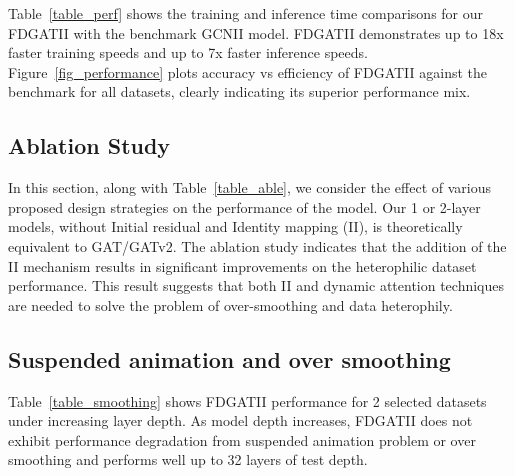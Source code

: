 \documentclass{article}
\begin{document}
Table~\ref{table_perf} shows the training and inference time comparisons for our FDGATII with the benchmark GCNII model. FDGATII demonstrates up to 18x faster training speeds and up to 7x faster inference speeds. Figure~\ref{fig_performance} plots accuracy vs efficiency of FDGATII against the benchmark for all datasets, clearly indicating its superior performance mix.

\subsection{Ablation Study}
In this section, along with Table~\ref{table_able}, we consider the effect of various proposed design strategies on the performance of the model. Our 1 or 2-layer models, without Initial residual and Identity mapping (II), is theoretically equivalent to GAT/GATv2. The ablation study indicates that the addition of the II mechanism results in significant improvements on the heterophilic dataset performance. This result suggests that both II and dynamic attention techniques are needed to solve the problem of over-smoothing and data heterophily.   

\subsection{Suspended animation and over smoothing}
Table~\ref{table_smoothing} shows FDGATII performance for 2 selected datasets under increasing layer depth. As model depth increases, FDGATII does not exhibit performance degradation from suspended animation problem or over smoothing and performs well up to 32 layers of test depth.   

\begin{table}[h]
\caption{Model accuracy with increasing layer depth shows no presence of over smoothing or suspended animation problem. We used a hidden dimension of 64 and Equation~\ref{eq-GCNII} variant for all tests.}
\end{table}
\end{document}

